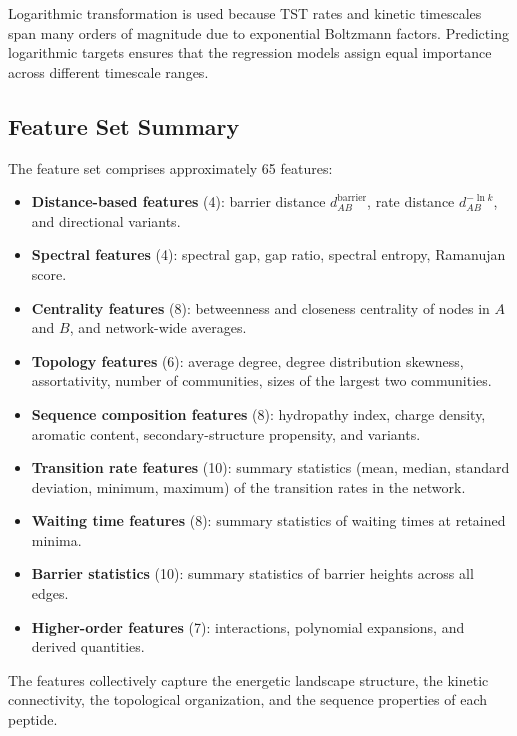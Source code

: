 Logarithmic transformation is used because TST rates and kinetic timescales span many
orders of magnitude due to exponential Boltzmann factors. Predicting logarithmic targets
ensures that the regression models assign equal importance across different timescale
ranges.


\subsection{Feature Set Summary}\label{subsec:feature-summary}

The feature set comprises approximately 65 features:

\begin{itemize}
  \item \textbf{Distance-based features} (4): barrier distance $d^{\mathrm{barrier}}_{AB}$,
        rate distance $d^{-\ln k}_{AB}$, and directional variants.
  \item \textbf{Spectral features} (4): spectral gap, gap ratio, spectral entropy,
        Ramanujan score.
  \item \textbf{Centrality features} (8): betweenness and closeness centrality of nodes
        in $A$ and $B$, and network-wide averages.
  \item \textbf{Topology features} (6): average degree, degree distribution skewness,
        assortativity, number of communities, sizes of the largest two communities.
  \item \textbf{Sequence composition features} (8): hydropathy index, charge density,
        aromatic content, secondary-structure propensity, and variants.
  \item \textbf{Transition rate features} (10): summary statistics (mean, median,
        standard deviation, minimum, maximum) of the transition rates in the network.
  \item \textbf{Waiting time features} (8): summary statistics of waiting times at
        retained minima.
  \item \textbf{Barrier statistics} (10): summary statistics of barrier heights across
        all edges.
  \item \textbf{Higher-order features} (7): interactions, polynomial expansions, and
        derived quantities.
\end{itemize}

The features collectively capture the energetic landscape structure, the kinetic
connectivity, the topological organization, and the sequence properties of each peptide.


